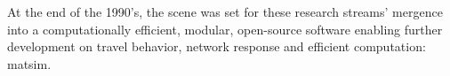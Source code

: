 

At the end of the 1990’s, the scene was set for these research streams' mergence into a computationally efficient, modular, open-source software enabling further development on travel behavior, network response and efficient computation: \gls{matsim}.




%

